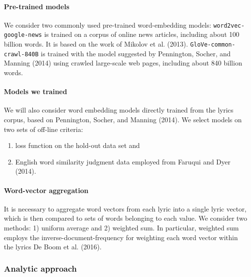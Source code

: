 \documentclass[
  letterpaper,
  DIV=11,
  numbers=noendperiod]{scrartcl}
\let\oldparagraph\paragraph
\renewcommand{\paragraph}[1]{\oldparagraph{#1}\mbox{}}
\providecommand{\tightlist}{%
  \setlength{\itemsep}{0pt}\setlength{\parskip}{0pt}}\usepackage{longtable,booktabs,array}
\begin{document}
\hypertarget{pre-trained-models}{%
\paragraph{Pre-trained models}\label{pre-trained-models}}

We consider two commonly used pre-trained word-embedding models:
\texttt{word2vec-google-news} is trained on a corpus of online news
articles, including about 100 billion words. It is based on the work of
Mikolov et al. (2013). \texttt{GloVe-common-crawl-840B} is trained with
the model suggested by Pennington, Socher, and Manning (2014) using
crawled large-scale web pages, including about 840 billion words.

\hypertarget{models-we-trained}{%
\paragraph{Models we trained}\label{models-we-trained}}

We will also consider word embedding models directly trained from the
lyrics corpus, based on Pennington, Socher, and Manning (2014). We
select models on two sets of off-line criteria:

\begin{enumerate}
\def\labelenumi{\arabic{enumi}.}
\tightlist
\item
  loss function on the hold-out data set and
\item
  English word similarity judgment data employed from Faruqui and Dyer
  (2014).
\end{enumerate}

\hypertarget{word-vector-aggregation}{%
\paragraph{Word-vector aggregation}\label{word-vector-aggregation}}

It is necessary to aggregate word vectors from each lyric into a single
lyric vector, which is then compared to sets of words belonging to each
value. We consider two methods: 1) uniform average and 2) weighted sum.
In particular, weighted sum employs the inverse-document-frequency for
weighting each word vector within the lyrics De Boom et al. (2016).

\hypertarget{analytic-approach}{%
\subsubsection{Analytic approach}\label{analytic-approach}}
\end{document}

